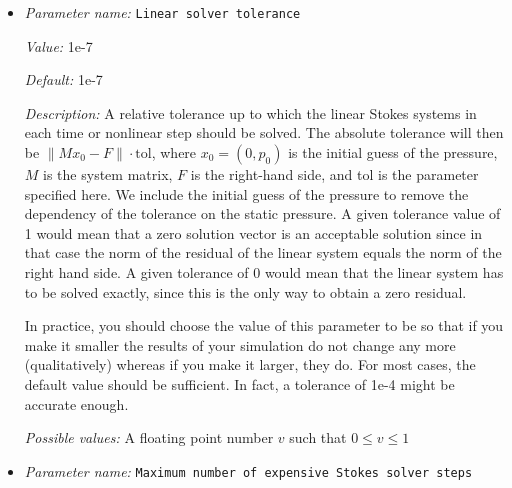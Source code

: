 \begin{itemize}
{\it Default:} 1e-6


{\it Description:} A relative tolerance up to which the approximate inverse of the $S$ block (i.e., the Schur complement matrix $S = BA^{-1}B^{T}$) of the Stokes system is computed. This approximate inverse of the $S$ block is used in the preconditioning used in the GMRES solver. The exact definition of this block preconditioner for the Stokes equation can be found in \cite{KHB12}.


{\it Possible values:} A floating point number $v$ such that $0 \leq v \leq 1$
\item {\it Parameter name:} {\tt Linear solver tolerance}
\label{parameters:Solver parameters/Stokes solver parameters/Linear solver tolerance}


{\it Value:} 1e-7


{\it Default:} 1e-7


{\it Description:} A relative tolerance up to which the linear Stokes systems in each time or nonlinear step should be solved. The absolute tolerance will then be $\| M x_0 - F \| \cdot \text{tol}$, where $x_0 = (0,p_0)$ is the initial guess of the pressure, $M$ is the system matrix, $F$ is the right-hand side, and tol is the parameter specified here. We include the initial guess of the pressure to remove the dependency of the tolerance on the static pressure. A given tolerance value of 1 would mean that a zero solution vector is an acceptable solution since in that case the norm of the residual of the linear system equals the norm of the right hand side. A given tolerance of 0 would mean that the linear system has to be solved exactly, since this is the only way to obtain a zero residual.

In practice, you should choose the value of this parameter to be so that if you make it smaller the results of your simulation do not change any more (qualitatively) whereas if you make it larger, they do. For most cases, the default value should be sufficient. In fact, a tolerance of 1e-4 might be accurate enough.


{\it Possible values:} A floating point number $v$ such that $0 \leq v \leq 1$
\item {\it Parameter name:} {\tt Maximum number of expensive Stokes solver steps}
\label{parameters:Solver parameters/Stokes solver parameters/Maximum number of expensive Stokes solver steps}



\end{itemize}
